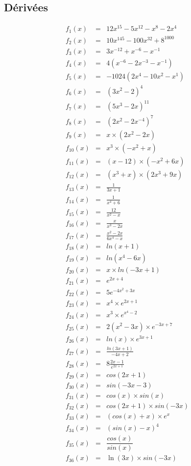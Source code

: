 \documentclass[11pt]{article}
\begin{document}
\begin{multicols}{3}
\section*{Dérivées}

\begin{eqnarray*}
f_{1}(x) &=& 12x^{15} - 5x^{12} - x^{8}-2x^{4}\\
f_{2}(x) &=& 10x^{145} - 100x^{32} + 8^{1000}\\
f_{3}(x) &=& 3x^{-12} + x^{-6} - x^{-1}\\
f_{4}(x) &=& 4(x^{-6} - 2x^{-3} - x^{-1})\\
f_{5}(x) &=& -1024 (2x^{4} - 10x^{2} - x^{1})\\
f_{6}(x) &=& (3x^{2} - 2)^{4}\\
f_{7}(x) &=& (5x^{3} - 2x)^{11}\\
f_{8}(x) &=& (2x^{2} - 2x^{-4})^{7}\\
f_{9}(x) &=& x \times (2x^{2} - 2x)\\
f_{10}(x) &=& x^3 \times (-x^{2} + x) \\
f_{11}(x) &=& (x - 12) \times (-x^{2} + 6x)\\
f_{12}(x) &=& (x^3 + x) \times (2x^{3} + 9x)\\
f_{13}(x) &=& \frac{1}{3x + 1}\\
f_{14}(x) &=& \frac{1}{x^4 + 6}\\
f_{15}(x) &=& \frac{12}{x^2 - x}\\
f_{16}(x) &=& \frac{x}{x^3 - 2x}\\
f_{17}(x) &=& \frac{x^2 - 2x}{6x^4 - x}\\
f_{18}(x) &=& ln(x+1)\\
f_{19}(x) &=& ln(x^4 - 6x)\\
f_{20}(x) &=& x \times ln(-3x + 1)\\
f_{21}(x) &=& e^{2x +4}\\
f_{22}(x) &=& 5 e^{-4x^2 + 3x}\\
f_{23}(x) &=& x^4 \times e^{2x + 1}\\
f_{24}(x) &=& x^3 \times e^{x^4 - 2}\\
f_{25}(x) &=& 2 (x^2 - 3x) \times e^{-3x + 7}\\
f_{26}(x) &=& ln(x) \times e^{3x + 1}\\
f_{27}(x) &=& \frac{ln(3x+1)}{-4x+2}\\
f_{28}(x) &=& 8 \frac{2x-1}{e^{2x+1}}\\
f_{29}(x) &=& cos(2x+1)\\
f_{30}(x) &=& sin(-3x-3)\\
f_{31}(x) &=& cos(x) \times sin(x)\\
f_{32}(x) &=& cos(2x+1) \times sin(-3x)\\
f_{33}(x) &=& (cos(x) + x) \times e^{x}\\
f_{34}(x) &=& (sin(x) - x)^{4}\\
f_{35}(x) &=& \dfrac{cos(x)}{sin(x)}\\
f_{36}(x) &=& \ln(3x) \times sin(-3x)\\
\end{eqnarray*}

\end{multicols}
\end{document}

